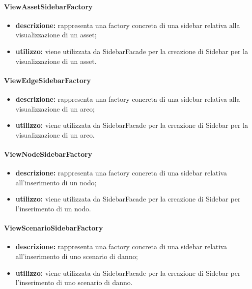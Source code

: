 \paragraph{ViewAssetSidebarFactory}
\begin{itemize}
	\item \textbf{descrizione:} rappresenta una factory concreta di una sidebar relativa alla visualizzazione di un asset;
	\item \textbf{utilizzo:} viene utilizzata da SidebarFacade per la creazione di Sidebar per la visualizzazione di un asset.
\end{itemize}
\paragraph{ViewEdgeSidebarFactory}
\begin{itemize}
	\item \textbf{descrizione:} rappresenta una factory concreta di una sidebar relativa alla visualizzazione di un arco;
	\item \textbf{utilizzo:} viene utilizzata da SidebarFacade per la creazione di Sidebar per la visualizzazione di un arco.
\end{itemize}
\paragraph{ViewNodeSidebarFactory}
\begin{itemize}
	\item \textbf{descrizione:} rappresenta una factory concreta di una sidebar relativa all'inserimento di un nodo;
	\item \textbf{utilizzo:} viene utilizzata da SidebarFacade per la creazione di Sidebar per l'inserimento di un nodo.
\end{itemize}
\paragraph{ViewScenarioSidebarFactory}
\begin{itemize}
	\item \textbf{descrizione:} rappresenta una factory concreta di una sidebar relativa all'inserimento di uno scenario di danno;
	\item \textbf{utilizzo:} viene utilizzata da SidebarFacade per la creazione di Sidebar per l'inserimento di uno scenario di danno.
\end{itemize}
\newpage
